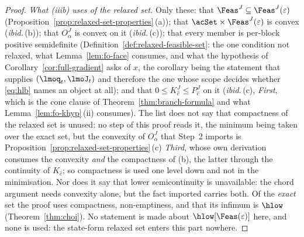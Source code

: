 \begin{proof}
\emph{What (iiib) uses of the relaxed set.} Only these: that
$\Feas^{J}\subseteq\Feas^{J}(\varepsilon)$
(Proposition~\ref{prop:relaxed-set-properties}\,(a)); that
$\acSet\times\Feas^{J}(\varepsilon)$ is convex (\emph{ibid.}\,(b)); that
$O^{J}_{\alpha}$ is convex on it (\emph{ibid.}\,(c)); that every member is
per-block positive semidefinite (Definition~\ref{def:relaxed-feasible-set}:
the one condition not relaxed, what Lemma~\ref{lem:fo-face} consumes, and
what the hypothesis of Corollary~\ref{cor:full-gradient} asks of $x$, the
corollary being the statement that supplies $(\lmoq_t,\lmoJ_t)$ and
therefore the one whose scope decides whether \eqref{eq:hlb} names an
object at all); and that $0\le K^{J}_{\hat c}\le P^{J}_{\hat c}$ on it
(\emph{ibid.}\,(c), \emph{First}, which is the cone clause of
Theorem~\ref{thm:branch-formula} and what Lemma~\ref{lem:fo-khyp}\,(ii)
consumes). The list does not say that compactness of the relaxed set is
unused: no step of this proof reads it, the minimum being taken over the
exact set, but the convexity of $O^{J}_{\alpha}$ that Step~2 imports is
Proposition~\ref{prop:relaxed-set-properties}\,(c) \emph{Third}, whose own
derivation consumes the convexity \emph{and} the compactness of (b), the
latter through the continuity of $K_{\hat c}$; so compactness is used one
level down and not in the minimisation. Nor does it say that lower
semicontinuity is unavailable: the chord argument needs convexity alone,
but the fact imported carries both. Of the \emph{exact} set the proof uses
compactness, non-emptiness, and that its infimum is $\hlow$
(Theorem~\ref{thm:choi}). No statement is made about
$\hlow[\Feas(\varepsilon)]$ here, and none is used: the state-form relaxed
set enters this part nowhere.


\end{proof}
